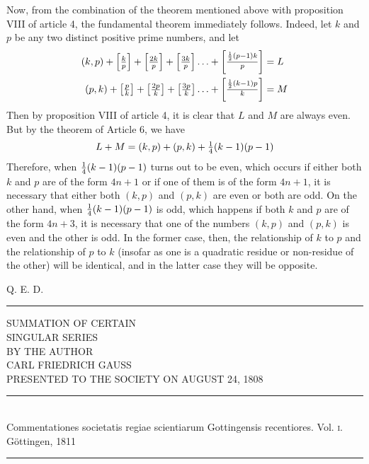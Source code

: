 \documentclass[twoside,12pt]{memoir}
\let\oldfrac\frac
\def\frac#1#2{\mathchoice{\tfrac{#1}{#2}}{\oldfrac{#1}{#2}}{\genfrac{}{}{}{2}{#1}{#2\mathstrut}}{\genfrac{}{}{}{3}{#1}{#2\mathstrut}}}
\begin{document}
Now, from the combination of the theorem mentioned above with proposition VIII of article 4, the fundamental theorem immediately follows. Indeed, let \(k\) and \(p\) be any two distinct positive prime numbers, and let
\[\begin{aligned}
(k, p)+\left[\frac{k}{p}\right]+\left[\frac{2 k}{p}\right]+\left[\frac{3 k}{p}\right] \ldots+\left[\frac{\frac{1}{2} (p-1) k}{p}\right] &=L\\
(p, k)+\left[\frac{p}{k}\right]+\left[\frac{2 p}{k}\right]+\left[\frac{3 p}{k}\right] \ldots+\left[\frac{\frac{1}{2} (k-1) p}{k}\right] &= M
\end{aligned}\]
Then by proposition VIII of article 4, it is clear that \(L\) and \(M\) are always even. But by the theorem of Article 6, we have
\[L+M=(k, p)+(p, k)+\frac{1}{4}(k-1)(p-1)\]
Therefore, when \(\frac{1}{4}(k-1)(p-1)\) turns out to be even, which occurs if either both \(k\) and \(p\) are of the form \(4n+1\) or if one of them is of the form \(4n+1\), it is necessary that either both \((k, p)\) and \((p, k)\) are even or both are odd. On the other hand, when \(\frac{1}{4}(k-1)(p-1)\) is odd, which happens if both \(k\) and \(p\) are of the form \(4n+3\), it is necessary that one of the numbers \((k, p)\) and \((p, k)\) is even and the other is odd. In the former case, then, the relationship of \(k\) to \(p\) and the relationship of \(p\) to \(k\) (insofar as one is a quadratic residue or non-residue of the other) will be identical, and in the latter case they will be opposite.

\qquad Q. E. D.
\begin{center}\rule{1.5in}{0.5pt}\end{center}
\pagebreak
%

\begin{center}
{\large SUMMATION OF CERTAIN }\\[4\baselineskip]
{\LARGE SINGULAR SERIES}\\[4\baselineskip]
{\scriptsize BY THE AUTHOR}\\[1.5\baselineskip]
{CARL FRIEDRICH GAUSS}\\[1.5\baselineskip]
{\scriptsize PRESENTED TO THE SOCIETY ON AUGUST 24, 1808}\\[4\baselineskip]
\rule{4in}{0.5pt}\\[0.5\baselineskip]
{\scriptsize Commentationes societatis regiae scientiarum Gottingensis recentiores. Vol. \textsc{i}.\\
Göttingen, \textsc{1811}}\\
\rule{4in}{0.5pt}
\end{center}
\clearpage\noindent
\end{document}
